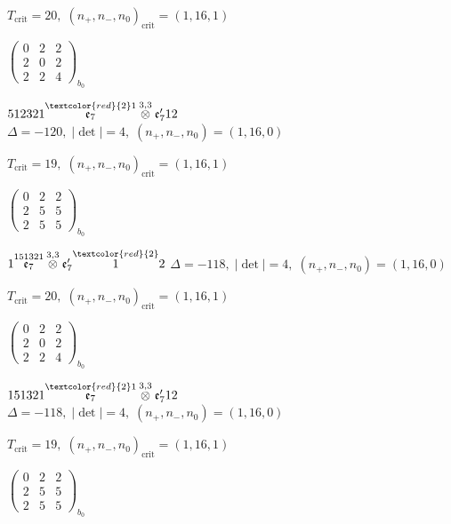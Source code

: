 \documentclass[10pt]{article}
\begin{document}
\hspace{1em}$T_{\text{crit}}=20,\; (n_+,n_-,n_0)_{\text{crit}}=(1,16,1)$

\hspace{2em}$\left(\begin{smallmatrix}0 & 2 & 2 \\ 2 & 0 & 2 \\ 2 & 2 & 4\end{smallmatrix}\right)_{\!b_0}$

$512321\overset{\textcolor{red}{2}1}{\mathfrak{e}_7}\overset{3,3}{\otimes}\mathfrak{e}_7'12$ \quad $\Delta=-120,\; |\det|=4,\; (n_+,n_-,n_0)=(1,16,0)$

\hspace{1em}$T_{\text{crit}}=19,\; (n_+,n_-,n_0)_{\text{crit}}=(1,16,1)$

\hspace{2em}$\left(\begin{smallmatrix}0 & 2 & 2 \\ 2 & 5 & 5 \\ 2 & 5 & 5\end{smallmatrix}\right)_{\!b_0}$

\smallskip

$1\overset{151321}{\mathfrak{e}_7}\overset{3,3}{\otimes}\mathfrak{e}_7'\overset{\textcolor{red}{2}}{1}2$ \quad $\Delta=-118,\; |\det|=4,\; (n_+,n_-,n_0)=(1,16,0)$

\hspace{1em}$T_{\text{crit}}=20,\; (n_+,n_-,n_0)_{\text{crit}}=(1,16,1)$

\hspace{2em}$\left(\begin{smallmatrix}0 & 2 & 2 \\ 2 & 0 & 2 \\ 2 & 2 & 4\end{smallmatrix}\right)_{\!b_0}$

$151321\overset{\textcolor{red}{2}1}{\mathfrak{e}_7}\overset{3,3}{\otimes}\mathfrak{e}_7'12$ \quad $\Delta=-118,\; |\det|=4,\; (n_+,n_-,n_0)=(1,16,0)$

\hspace{1em}$T_{\text{crit}}=19,\; (n_+,n_-,n_0)_{\text{crit}}=(1,16,1)$

\hspace{2em}$\left(\begin{smallmatrix}0 & 2 & 2 \\ 2 & 5 & 5 \\ 2 & 5 & 5\end{smallmatrix}\right)_{\!b_0}$
\end{document}
